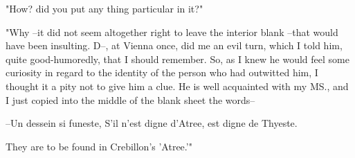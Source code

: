 \documentclass{article}
\begin{document}
"How? did you put any thing particular in it?"

"Why --it did not seem altogether right to leave the interior blank --that would have been insulting. D--, at Vienna once, did me an evil turn, which I told him, quite good-humoredly, that I should remember. So, as I knew he would feel some curiosity in regard to the identity of the person who had outwitted him, I thought it a pity not to give him a clue. He is well acquainted with my MS., and I just copied into the middle of the blank sheet the words--

--Un dessein si funeste, S'il n'est digne d'Atree, est digne de Thyeste.

They are to be found in Crebillon's 'Atree.'"
\end{document}
